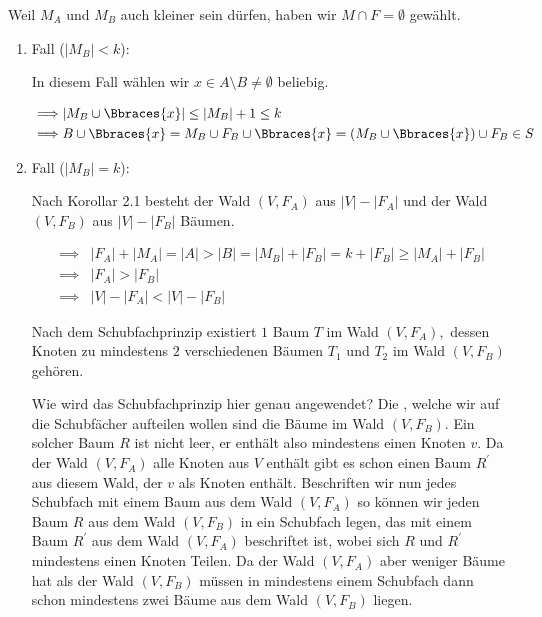 \begin{solution}
\begin{enumerate}[label = \arabic*.]
    Weil $M_A$ und $M_B$ auch kleiner sein dürfen, haben wir $M \cap F = \emptyset$ gewählt.

    \begin{enumerate}[label = \arabic*.]
        
        \item Fall ($|M_B| < k$):
        
        In diesem Fall wählen wir $x \in A \setminus B \neq \emptyset$ beliebig.

        \begin{align*}
            \implies &
            |M_B \cup \Bbraces{x}| \leq |M_B| + 1 \leq k \\
            \implies &
            B \cup \Bbraces{x}
            =
            M_B \cup F_B \cup \Bbraces{x}
            =
            (M_B \cup \Bbraces{x}) \cup F_B
            \in
            S
        \end{align*}
        
        \item Fall ($|M_B| = k$):
        
        Nach Korollar 2.1 besteht der Wald $(V, F_A)$ aus $|V| - |F_A|$ und der Wald $(V, F_B)$ aus $|V| - |F_B|$ Bäumen.

        \begin{align*}
            \implies &
            |F_A| + |M_A|  = |A| > |B| = |M_B| + |F_B| = k + |F_B| \geq |M_A| + |F_B| \\
            \implies &
            |F_A| > |F_B| \\
            \implies &
            |V| - |F_A| < |V| - |F_B|
        \end{align*}

        Nach dem Schubfachprinzip existiert $1$ Baum $T$ im Wald $(V, F_A),$ dessen Knoten zu mindestens $2$ verschiedenen Bäumen $T_1$ und $T_2$ im Wald $(V, F_B)$ gehören.

        Wie wird das Schubfachprinzip hier genau angewendet?
        Die , welche wir auf die Schubfächer aufteilen wollen sind die Bäume im Wald $(V, F_B)$.
        Ein solcher Baum $R$ ist nicht leer, er enthält also mindestens einen Knoten $v$.
        Da der Wald $(V, F_A)$ alle Knoten aus $V$ enthält gibt es schon einen Baum $R^\prime$ aus diesem Wald, der $v$ als Knoten enthält.
        Beschriften wir nun jedes Schubfach mit einem Baum aus dem Wald $(V, F_A)$ so können wir jeden Baum $R$ aus dem Wald $(V, F_B)$ in ein Schubfach legen, das mit einem Baum $R^\prime$ aus dem Wald $(V, F_A)$ beschriftet ist, wobei sich $R$ und $R^\prime$ mindestens einen Knoten Teilen.
        Da der Wald $(V, F_A)$ aber weniger Bäume hat als der Wald $(V, F_B)$ müssen in mindestens einem Schubfach dann schon mindestens zwei Bäume aus dem Wald $(V, F_B)$ liegen.


\end{enumerate}
\end{enumerate}
\end{solution}

